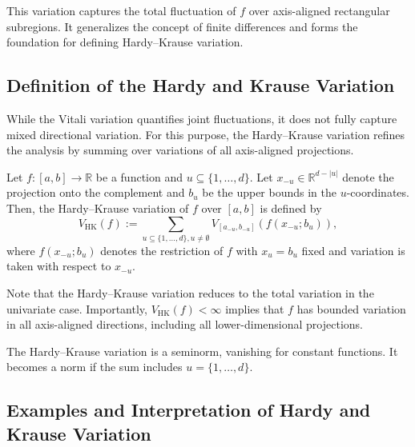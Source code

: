 This variation captures the total fluctuation of $f$ over axis-aligned rectangular subregions. It generalizes the concept of finite differences and forms the foundation for defining Hardy–Krause variation.

\subsection{Definition of the Hardy and Krause Variation}
\label{sec:hk-variation}

While the Vitali variation quantifies joint fluctuations, it does not fully capture mixed directional variation. For this purpose, the Hardy–Krause variation refines the analysis by summing over variations of all axis-aligned projections.

\begin{definition}
Let $f \colon [a,b] \to \mathbb{R}$ be a function and $u \subseteq \{1,\dots,d\}$. Let $x_{-u} \in \mathbb{R}^{d - |u|}$ denote the projection onto the complement and $b_u$ be the upper bounds in the $u$-coordinates. Then, the Hardy–Krause variation of $f$ over $[a,b]$ is defined by
\begin{equation*}
    V_{\mathrm{HK}}(f) := \sum_{u \subseteq \{1,\dots,d\}, u \neq \emptyset} V_{[a_{-u}, b_{-u}]}(f(x_{-u}; b_u)),
\end{equation*}
where $f(x_{-u}; b_u)$ denotes the restriction of $f$ with $x_u = b_u$ fixed and variation is taken with respect to $x_{-u}$.
\end{definition}

Note that the Hardy–Krause variation reduces to the total variation in the univariate case. Importantly, $V_{\mathrm{HK}}(f) < \infty$ implies that $f$ has bounded variation in all axis-aligned directions, including all lower-dimensional projections.

\begin{remark}
The Hardy–Krause variation is a seminorm, vanishing for constant functions. It becomes a norm if the sum includes $u = \{1,\dots,d\}$.
\end{remark}

\subsection{Examples and Interpretation of Hardy and Krause Variation}
\label{sec:hk-examples}

